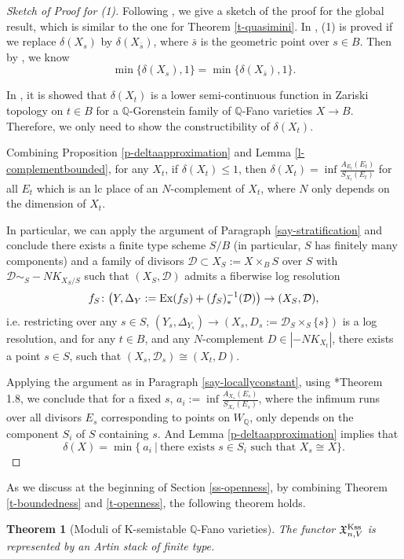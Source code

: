 \documentclass[12pt,reqno]{amsart}%
\newtheorem{thm}{Theorem}[section]
\theoremstyle{definition}
\theoremstyle{remark}
\newcommand{\bQ}{{\mathbb{Q}}}
\begin{document}
\begin{proof}[Sketch of Proof for (1)]Following \cite{BLX19}, we give a sketch of the proof for the global result, which is similar to the one for Theorem \ref{t-quasimini}. 
 In \cite{BLX19}, (1) is proved if we replace $\delta(X_{s})$ by $\delta(X_{\bar{s}})$, where $\bar{s}$ is the geometric point over $s\in B$. Then by \cite{Zhu20}, we know
 $$\min\{\delta(X_{s}),1\}= \min\{\delta(X_{\bar{s}}),1\}.$$

In \cite{BL18}, it is showed that $\delta(X_t)$ is a lower semi-continuous function in Zariski topology on  $t\in B$ for a $\mathbb{Q}$-Gorenstein family of $\mathbb{Q}$-Fano varieties $X\to B$. Therefore, we only need to show the constructibility of $\delta(X_t)$. 


Combining  Proposition \ref{p-deltaapproximation} and Lemma \ref{l-complementbounded}, for any $X_t$, if $\delta(X_t)\le 1$, then $\delta(X_t)=\inf \frac{A_{E_t}(E_t)}{S_{X_t}(E_t)}$ for all $E_t$ which is an lc place of an $N$-complement of $X_t$, where $N$ only depends on the dimension of $X_t$. 

In particular, we can apply the argument of Paragraph \ref{say-stratification} and conclude there exists a finite type scheme $S/B$ (in particular, $S$ has finitely many components) and a family of divisors $\mathcal{D}\subset X_S:=X\times_BS$  over $S$ with $\mathcal{D}\sim_{S}-NK_{X_S/S}$ such that $(X_S,\mathcal{D})$ admits a fiberwise log resolution 
$$f_S\colon \big(Y, \Delta_Y:={\rm Ex}(f_S)+(f_S)_*^{-1}(\mathcal{D})\big)\to (X_S,\mathcal{D}),$$ i.e. restricting over any $s\in S$, $(Y_s,\Delta_{Y_s})\to (X_s, D_s:=\mathcal{D}_S\times_S\{s\})$ is a log resolution, and for any $t\in B$, and any $N$-complement $D\in |-NK_{X_t}|$, there exists a point $s\in S$, such that $(X_s, \mathcal{D}_s)\cong (X_t, D)$.


 Applying the argument as in Paragraph \ref{say-locallyconstant}, using \cite{HMX13}*{Theorem 1.8}, we conclude that for a fixed $s$, $a_i:=\inf\frac{A_{X_s}(E_s)}{S_{X_s}(E_s)}$, where the infimum runs over all divisors $E_s$ corresponding to points on $W_{\bQ}$,  only depends on the component $S_i$ of $S$ containing $s$. And Lemma \ref{p-deltaapproximation} implies that 
$$\delta(X)=\min \{\ a_i\ |\  \mbox{there exists $s\in S_i$ such that $X_s\cong X$}\}.$$
\end{proof}
As we discuss at the beginning of Section \ref{ss-openness}, by combining Theorem \ref{t-boundedness} and \ref{t-openness}, the following theorem holds. 
 \begin{thm}[Moduli of K-semistable $\bQ$-Fano varieties]\label{c-moduli}
The functor $\mathfrak{X}^{\rm Kss}_{n,V}$ is represented by an Artin stack of finite type.
\end{thm}
\end{document}

